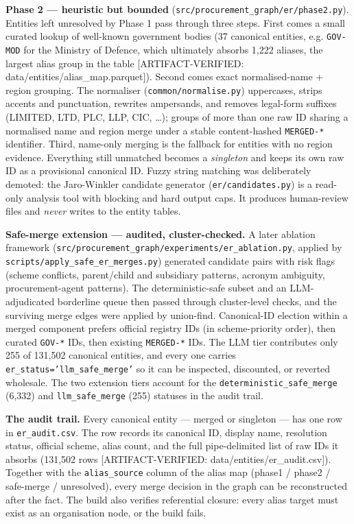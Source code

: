 \textbf{Phase 2 --- heuristic but bounded} (\texttt{src/procurement\_graph/er/phase2.py}). Entities left unresolved by Phase 1 pass through three steps. First comes a small curated lookup of well-known government bodies (37 canonical entities, e.g. \texttt{GOV-MOD} for the Ministry of Defence, which ultimately absorbs 1,222 aliases, the largest alias group in the table [ARTIFACT-VERIFIED: data/entities/alias\_map.parquet]). Second comes exact normalised-name + region grouping. The normaliser (\texttt{common/normalise.py}) uppercases, strips accents and punctuation, rewrites ampersands, and removes legal-form suffixes (LIMITED, LTD, PLC, LLP, CIC, \ldots{}); groups of more than one raw ID sharing a normalised name and region merge under a stable content-hashed \texttt{MERGED-*} identifier. Third, name-only merging is the fallback for entities with no region evidence. Everything still unmatched becomes a \emph{singleton} and keeps its own raw ID as a provisional canonical ID. Fuzzy string matching was deliberately demoted: the Jaro-Winkler candidate generator (\texttt{er/candidates.py}) is a read-only analysis tool with blocking and hard output caps. It produces human-review files and \emph{never} writes to the entity tables.

\textbf{Safe-merge extension --- audited, cluster-checked.} A later ablation framework (\texttt{src/procurement\_graph/experiments/er\_ablation.py}, applied by \texttt{scripts/apply\_safe\_er\_merges.py}) generated candidate pairs with risk flags (scheme conflicts, parent/child and subsidiary patterns, acronym ambiguity, procurement-agent patterns). The deterministic-safe subset and an LLM-adjudicated borderline queue then passed through cluster-level checks, and the surviving merge edges were applied by union-find. Canonical-ID election within a merged component prefers official registry IDs (in scheme-priority order), then curated \texttt{GOV-*} IDs, then existing \texttt{MERGED-*} IDs. The LLM tier contributes only 255 of 131,502 canonical entities, and every one carries \texttt{er\_status='llm\_safe\_merge'} so it can be inspected, discounted, or reverted wholesale. The two extension tiers account for the \texttt{deterministic\_safe\_merge} (6,332) and \texttt{llm\_safe\_merge} (255) statuses in the audit trail.

\textbf{The audit trail.} Every canonical entity --- merged or singleton --- has one row in \texttt{er\_audit.csv}. The row records its canonical ID, display name, resolution status, official scheme, alias count, and the full pipe-delimited list of raw IDs it absorbs (131,502 rows [ARTIFACT-VERIFIED: data/entities/er\_audit.csv]). Together with the \texttt{alias\_source} column of the alias map (phase1 / phase2 / safe-merge / unresolved), every merge decision in the graph can be reconstructed after the fact. The build also verifies referential closure: every alias target must exist as an organisation node, or the build fails.

